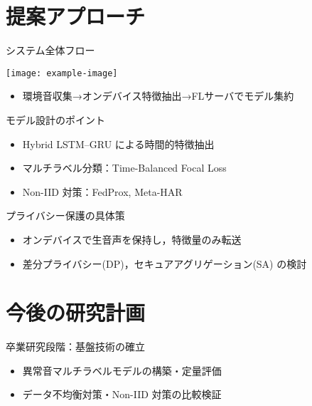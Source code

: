 \documentclass[unicode,12pt,aspectratio=169,dvipdfmx]{beamer}
\begin{document}
\section{提案アプローチ}

\begin{frame}{システム全体フロー}
  \begin{center}
    \texttt{[image: example-image]} %
  \end{center}
  \begin{itemize}
    \item 環境音収集→オンデバイス特徴抽出→FLサーバでモデル集約
  \end{itemize}
\end{frame}

\begin{frame}{モデル設計のポイント}
  \begin{itemize}
    \item Hybrid LSTM–GRU による時間的特徴抽出
    \item マルチラベル分類：Time-Balanced Focal Loss
    \item Non-IID 対策：FedProx, Meta-HAR
  \end{itemize}
\end{frame}

\begin{frame}{プライバシー保護の具体策}
  \begin{itemize}
    \item オンデバイスで生音声を保持し，特徴量のみ転送
    \item 差分プライバシー(DP)，セキュアアグリゲーション(SA) の検討
  \end{itemize}
\end{frame}

\section{今後の研究計画}

\begin{frame}{卒業研究段階：基盤技術の確立}
  \begin{itemize}
    \item 異常音マルチラベルモデルの構築・定量評価
    \item データ不均衡対策・Non-IID 対策の比較検証
  \end{itemize}
\end{frame}
\end{document}
